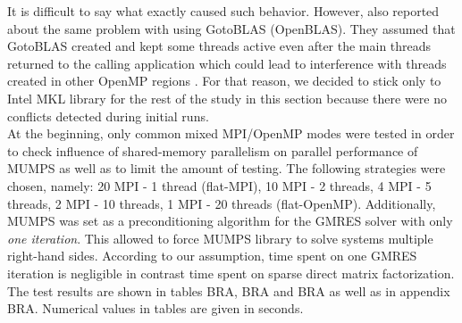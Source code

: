 It is difficult to say what exactly caused such behavior. However, \citeauthor{chowdhury2010some} also reported about the same problem with using GotoBLAS (OpenBLAS). They assumed that GotoBLAS created and kept some threads active even after the main threads returned to the calling application which could lead to interference with threads created in other OpenMP regions \cite{chowdhury2010some}. For that reason, we decided to stick only to Intel MKL library for the rest of the study in this section because there were no conflicts detected during initial runs.\\


At the beginning, only common mixed MPI/OpenMP modes were tested in order to check influence of shared-memory parallelism on parallel performance of MUMPS as well as to limit the amount of testing. The following strategies were chosen, namely: 20 MPI - 1 thread (flat-MPI), 10 MPI - 2 threads, 4 MPI - 5 threads, 2 MPI - 10 threads, 1 MPI - 20 threads (flat-OpenMP). Additionally, MUMPS was set as a preconditioning algorithm for the GMRES solver with only \textit{one iteration}. This allowed to force MUMPS library to solve systems multiple right-hand sides. According to our assumption, time spent on one GMRES iteration is negligible in contrast time spent on sparse direct matrix factorization. The test results are shown in tables BRA, BRA and BRA as well as in appendix BRA. Numerical values in tables are given in seconds.\\
















